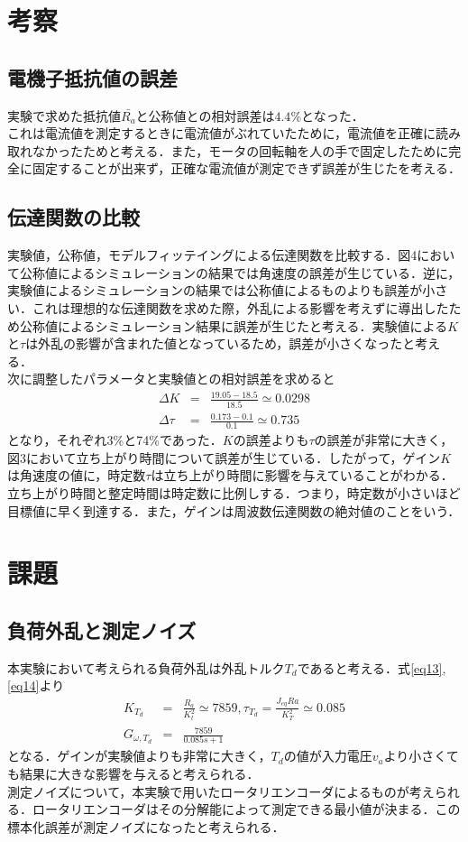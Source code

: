 \documentclass[11pt,a4paper]{jsarticle}
\begin{document}
  \newpage

 \section{考察}
  \subsection{電機子抵抗値の誤差}
  実験で求めた抵抗値$\bar{R_a}$と公称値との相対誤差は$4.4\%$となった．\\
  これは電流値を測定するときに電流値がぶれていたために，電流値を正確に読み取れなかったためと考える．また，モータの回転軸を人の手で固定したために完全に固定することが出来ず，正確な電流値が測定できず誤差が生じたを考える．
  \subsection{伝達関数の比較}
  実験値，公称値，モデルフィッテイングによる伝達関数を比較する．図4において公称値によるシミュレーションの結果では角速度の誤差が生じている．逆に，実験値によるシミュレーションの結果では公称値によるものよりも誤差が小さい．これは理想的な伝達関数を求めた際，外乱による影響を考えずに導出したため公称値によるシミュレーション結果に誤差が生じたと考える．実験値による$K$と$\tau$は外乱の影響が含まれた値となっているため，誤差が小さくなったと考える． \\
  次に調整したパラメータと実験値との相対誤差を求めると
  \begin{eqnarray}
   \Delta K & = & \frac{19.05-18.5}{18.5} \simeq 0.0298 \\
   \Delta \tau & = & \frac{0.173-0.1}{0.1} \simeq 0.735 
  \end{eqnarray}
  となり，それぞれ3\%と74\%であった．$K$の誤差よりも$\tau$の誤差が非常に大きく，図3において立ち上がり時間について誤差が生じている．したがって，ゲイン$K$は角速度の値に，時定数$\tau$は立ち上がり時間に影響を与えていることがわかる．立ち上がり時間と整定時間は時定数に比例しする．つまり，時定数が小さいほど目標値に早く到達する．また，ゲインは周波数伝達関数の絶対値のことをいう．
  
 \section{課題}
  \subsection{負荷外乱と測定ノイズ}
  本実験において考えられる負荷外乱は外乱トルク$T_d$であると考える．式\ref{eq13},\ref{eq14}より
  \begin{eqnarray}
   K_{T_d} & = & \frac{R_a}{K_t^2} \simeq 7859 , \tau_{T_d} = \frac{J_{eq} Ra}{K_T^2} \simeq 0.085 \\
   G_{\omega , T_d} & = & \frac{7859}{0.085s+1}
  \end{eqnarray}
  となる．ゲインが実験値よりも非常に大きく，$T_d$の値が入力電圧$v_a$より小さくても結果に大きな影響を与えると考えられる．\\
  測定ノイズについて，本実験で用いたロータリエンコーダによるものが考えられる．ロータリエンコーダはその分解能によって測定できる最小値が決まる．この標本化誤差が測定ノイズになったと考えられる．
  
\end{document}
